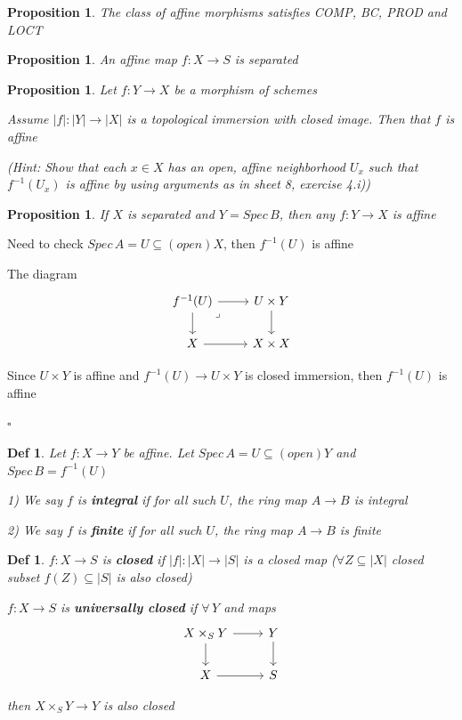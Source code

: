 \documentclass{article}
\newtheorem{definition}[theorem]{Def}
\newtheorem{proposition}[theorem]{Proposition}
\newenvironment{Proof}{{\noindent \indent \it Proof:\quad}}{\hfill $\square$\par}
\begin{document}
\begin{proposition}
    The class of affine morphisms satisfies COMP, BC, PROD and LOCT
\end{proposition}

\begin{proposition}
    An affine map $f : X \to S$ is separated
\end{proposition}

\begin{proposition}
    Let $f : Y \to X$ be a morphism of schemes
    
Assume $|f|: |Y | \to |X|$ is a topological immersion with closed image. Then that $f$ is affine

(Hint: Show that each $x \in X$ has an open, affine neighborhood $U_x$ such that $f^{-1}(U_x)$ is affine
by using arguments as in sheet 8, exercise 4.i))
\end{proposition}

\begin{proposition}
    If $X$ is separated and $Y=Spec\, B$, then any $f:Y\to X$ is affine
\end{proposition}
\begin{Proof}
    Need to check $Spec\,A=U\subseteq (open) X$, then $f^{-1}(U)$ is affine

    The diagram 
    \[\begin{tikzcd}
	{f^{-1}(U)} & {U\times Y} \\
	X & {X\times X}
	\arrow[from=2-1, to=2-2]
	\arrow[from=1-1, to=2-1]
	\arrow[from=1-2, to=2-2]
	\arrow["\lrcorner"{anchor=center, pos=0.125}, draw=none, from=1-1, to=2-2]
	\arrow[from=1-1, to=1-2]
\end{tikzcd}\]

Since $U\times Y$ is affine and $f^{-1}(U)\to U\times Y$ is closed immersion, then $f^{-1}(U)$ is affine

\end{Proof}

\begin{definition}
    Let $f:X\to Y$ be affine. Let $Spec\, A=U\subseteq(open)Y$ and $Spec\,B=f^{-1}(U)$

    1) We say $f$ is \textbf{integral} if for all such $U$, the ring map $A\to B$ is integral

    2) We say $f$ is \textbf{finite} if for all such $U$, the ring map $A\to B$ is finite
\end{definition}

\begin{definition}
    $f:X\to S$ is \textbf{closed} if $|f|:|X|\to |S|$ is a closed map ($\forall Z\subseteq |X|$ closed subset $f(Z)\subseteq |S|$ is also closed)

    $f:X\to S$ is \textbf{universally closed} if  $\forall\, Y$ and maps
\[\begin{tikzcd}
	{X\times_S Y} & Y \\
	X & S
	\arrow[from=1-1, to=2-1]
	\arrow[from=2-1, to=2-2]
	\arrow[from=1-2, to=2-2]
	\arrow[from=1-1, to=1-2]
\end{tikzcd}\]

 then $X\times_S Y\to Y$ is also closed
\end{definition}
\end{document}
